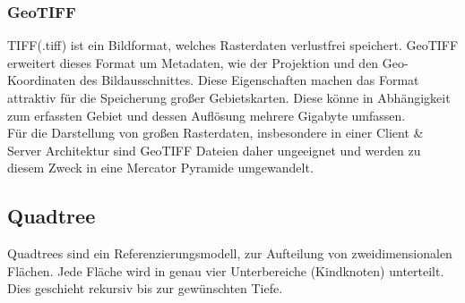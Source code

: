 \documentclass[10pt,conference,compsocconf]{IEEEtran}
\begin{document}
\subsubsection{GeoTIFF}
TIFF(.tiff) ist ein Bildformat, welches Rasterdaten verlustfrei speichert. GeoTIFF erweitert dieses Format um Metadaten, wie der Projektion und den Geo-Koordinaten des Bildausschnittes. Diese Eigenschaften machen das Format attraktiv für die Speicherung großer Gebietskarten. Diese könne in Abhängigkeit zum erfassten Gebiet und dessen Auflösung mehrere Gigabyte umfassen. \\
Für die Darstellung von großen Rasterdaten, insbesondere in einer Client \& Server Architektur sind GeoTIFF Dateien daher ungeeignet und werden zu diesem Zweck in eine Mercator Pyramide umgewandelt.\\


\subsection{Quadtree}
Quadtrees\cite{QuadTrees} sind ein Referenzierungsmodell, zur Aufteilung von zweidimensionalen Flächen. Jede Fläche wird in genau vier Unterbereiche (Kindknoten) unterteilt. Dies geschieht rekursiv bis zur gewünschten Tiefe.\\
\end{document}
